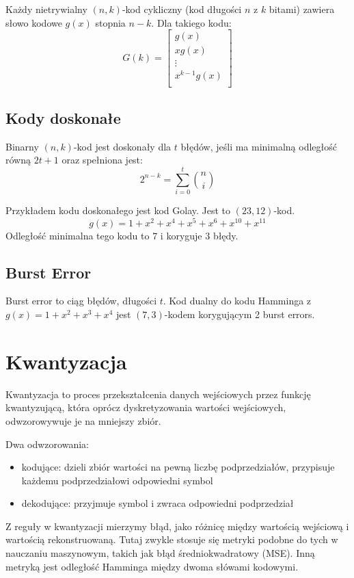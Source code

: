 \documentclass{../notatki}
\begin{document}
Każdy nietrywialny $(n, k)$-kod cykliczny (kod długości $n$ z $k$ bitami)
zawiera słowo kodowe $g(x)$ stopnia $n - k$. Dla takiego kodu:
$$
G(k) =
\begin{bmatrix}
  g(x) \\
  xg(x) \\
  \vdots \\
  x^{k - 1}g(x) \\
\end{bmatrix}
$$

\subsection{Kody doskonałe}

Binarny $(n, k)$-kod jest doskonały dla $t$ błędów, jeśli ma minimalną odległość
równą $2t + 1$ oraz spełniona jest:
$$
2^{n - k} = \sum_{i = 0}^{t} \binom{n}{i}
$$

Przykładem kodu doskonałego jest kod Golay. Jest to $(23, 12)$-kod.
$$
g(x) = 1 + x^2 + x^4 + x^5 + x^6 + x^10 + x^11
$$
Odległość minimalna tego kodu to $7$ i koryguje $3$ błędy.

\subsection{Burst Error}

Burst error to ciąg błędów, długości $t$. Kod dualny do kodu Hamminga z
$g(x)=1 + x^2 + x^3 + x^4$ jest $(7,3)$-kodem korygującym 2 burst errors.

\section{Kwantyzacja}

Kwantyzacja to proces przekształcenia danych wejściowych przez
funkcję kwantyzującą,
która oprócz dyskretyzowania wartości wejściowych, odwzorowywuje je na mniejszy
zbiór.

\noindent
Dwa odwzorowania:
\begin{itemize}
  \item kodujące: dzieli zbiór wartości na pewną liczbę podprzedziałów,
    przypisuje każdemu podprzedziałowi
    odpowiedni symbol
  \item dekodujące: przyjmuje symbol i zwraca odpowiedni podprzedział
\end{itemize}

Z reguły w kwantyzacji mierzymy błąd, jako różnicę między wartością wejściową
i wartością rekonstruowaną. Tutaj zwykle stosuje się metryki podobne do tych
w nauczaniu maszynowym, takich jak błąd średniokwadratowy (MSE). Inną metryką
jest odległość Hamminga między dwoma słówami kodowymi.
\end{document}
